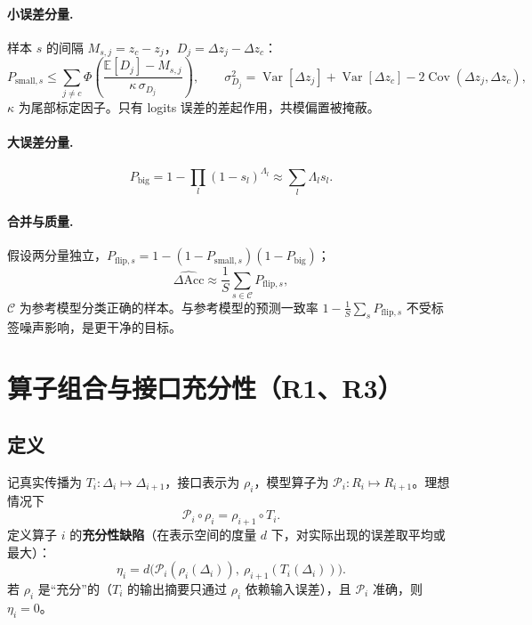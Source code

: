 \documentclass[11pt,a4paper]{ctexart}
\newcommand{\E}{\mathbb{E}}
\DeclareMathOperator{\Var}{Var}
\DeclareMathOperator{\Cov}{Cov}
\begin{document}
\paragraph{小误差分量.} 样本 $s$ 的间隔 $M_{s,j} = z_c - z_j$，$D_j = \Delta z_j - \Delta z_c$：
\begin{equation}
P_{\text{small},s} \le \sum_{j\ne c}\Phi\!\left(\frac{\E[D_j] - M_{s,j}}{\kappa\,\sigma_{D_j}}\right),\qquad
\sigma_{D_j}^2 = \Var[\Delta z_j] + \Var[\Delta z_c] - 2\Cov(\Delta z_j,\Delta z_c),
\end{equation}
$\kappa$ 为尾部标定因子。只有 logits 误差的差起作用，共模偏置被掩蔽。

\paragraph{大误差分量.}
\begin{equation}
P_{\text{big}} = 1 - \prod_l (1 - s_l)^{\Lambda_l} \approx \sum_l \Lambda_l s_l .
\end{equation}

\paragraph{合并与质量.} 假设两分量独立，$P_{\text{flip},s} = 1 - (1-P_{\text{small},s})(1-P_{\text{big}})$；
\begin{equation}
\widehat{\Delta\text{Acc}} \approx \frac{1}{S}\sum_{s\in\mathcal C} P_{\text{flip},s},
\end{equation}
$\mathcal C$ 为参考模型分类正确的样本。与参考模型的预测一致率 $1 - \frac1S\sum_s P_{\text{flip},s}$ 不受标签噪声影响，是更干净的目标。

\section{算子组合与接口充分性（R1、R3）}
\label{sec:composition}

\subsection{定义}
记真实传播为 $T_i:\Delta_i\mapsto\Delta_{i+1}$，接口表示为 $\rho_i$，模型算子为 $\mathcal P_i: R_i \mapsto R_{i+1}$。理想情况下
\begin{equation}
\mathcal P_i\circ\rho_i = \rho_{i+1}\circ T_i .
\end{equation}
定义算子 $i$ 的\textbf{充分性缺陷}（在表示空间的度量 $d$ 下，对实际出现的误差取平均或最大）：
\begin{equation}
\eta_i = d\bigl(\mathcal P_i(\rho_i(\Delta_i)),\ \rho_{i+1}(T_i(\Delta_i))\bigr).
\end{equation}
若 $\rho_i$ 是“充分”的（$T_i$ 的输出摘要只通过 $\rho_i$ 依赖输入误差），且 $\mathcal P_i$ 准确，则 $\eta_i = 0$。
\end{document}
